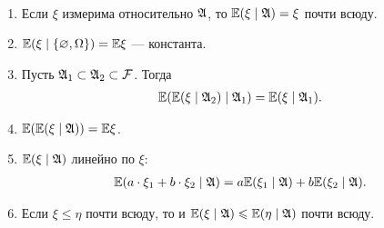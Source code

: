 \documentclass[../main.tex]{subfiles}
\begin{document}
\begin{prop}\
 \begin{enumerate}
  \item \label{umo_property_1} Если $ \xi $ измерима относительно $ \mathfrak A $, то $ \mathbb E(\xi \mid \mathfrak A) = \xi $ почти всюду.
  \item \label{umo_property_2} $ \mathbb E(\xi\mid \left\{ \varnothing,\Omega \right\}) = \mathbb E \xi $ --- константа.
  \item \label{umo_property_3} Пусть $ \mathfrak A_1 \subset \mathfrak A_2 \subset \mathcal F $. Тогда
   \begin{align*}
    \mathbb E(\mathbb E(\xi \mid \mathfrak A_2) \mid \mathfrak A_1) = \mathbb E(\xi \mid \mathfrak A_1).
   \end{align*}
  \item \label{umo_property_4} $ \mathbb E(\mathbb E(\xi \mid \mathfrak A)) = \mathbb E \xi $.
  \item \label{umo_property_5} $ \mathbb E(\xi \mid \mathfrak A) $ линейно по $ \xi $:
   \begin{align*}
    \mathbb E(a \cdot \xi_1 + b \cdot \xi_2 \mid \mathfrak A) = a \mathbb E(\xi_1 \mid \mathfrak A) + b\mathbb E(\xi_2 \mid \mathfrak A).
   \end{align*}
  \item \label{umo_property_6} Если $ \xi \leqslant \eta $ почти всюду, то и $ \mathbb E(\xi \mid \mathfrak A) \leqslant \mathbb E(\eta \mid \mathfrak A) $ почти всюду.
 \end{enumerate}
\end{prop}
\end{document}
